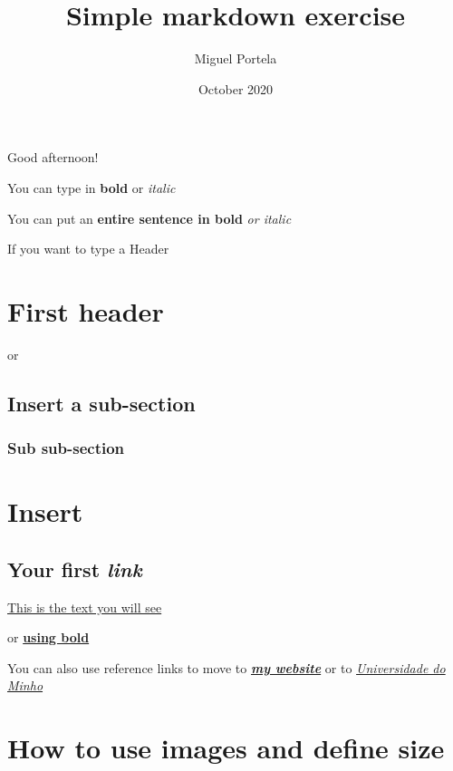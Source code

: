 \documentclass[
]{article}
\title{Simple markdown exercise}
\author{Miguel Portela}
\date{October 2020}
\begin{document}
\maketitle

Good afternoon!

You can type in \textbf{bold} or \emph{italic}

You can put an \textbf{entire sentence in bold} \emph{or italic}

If you want to type a Header

\hypertarget{first-header}{%
\section{First header}\label{first-header}}

or

\hypertarget{insert-a-sub-section}{%
\subsection{Insert a sub-section}\label{insert-a-sub-section}}

\hypertarget{sub-sub-section}{%
\subsubsection{Sub sub-section}\label{sub-sub-section}}

\hypertarget{insert}{%
\section{Insert}\label{insert}}

\hypertarget{your-first-link}{%
\subsection{\texorpdfstring{Your first \emph{link}}{Your first link}}\label{your-first-link}}

\href{https://www.markdowntutorial.com/}{This is the text you will see}

or \href{https://www.markdowntutorial.com/}{\textbf{using bold}}

You can also use reference links to move to \href{http://www1.eeg.uminho.pt/economia/mangelo/}{\emph{\textbf{my website}}} or to \href{https://www.uminho.pt/EN/}{\emph{Universidade do Minho}}

\hypertarget{how-to-use-images-and-define-size}{%
\section{How to use images and define size}\label{how-to-use-images-and-define-size}}
\end{document}
